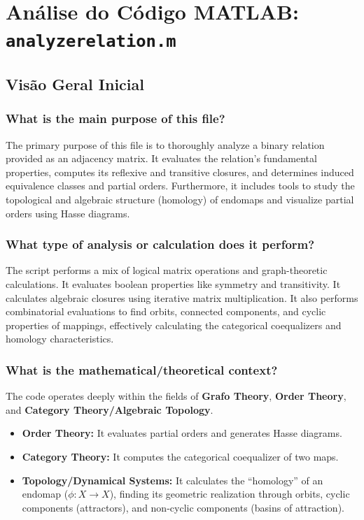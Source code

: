 \chapter{Análise do Código MATLAB: \texttt{analyzerelation.m}}
\section{Visão Geral Inicial}

\subsection*{What is the main purpose of this file?}
The primary purpose of this file is to thoroughly analyze a binary relation provided as an adjacency matrix. It evaluates the relation's fundamental properties, computes its reflexive and transitive closures, and determines induced equivalence classes and partial orders. Furthermore, it includes tools to study the topological and algebraic structure (homology) of endomaps and visualize partial orders using Hasse diagrams.

\subsection*{What type of analysis or calculation does it perform?}
The script performs a mix of logical matrix operations and graph-theoretic calculations. It evaluates boolean properties like symmetry and transitivity. It calculates algebraic closures using iterative matrix multiplication. It also performs combinatorial evaluations to find orbits, connected components, and cyclic properties of mappings, effectively calculating the categorical coequalizers and homology characteristics.

\subsection*{What is the mathematical/theoretical context?}
The code operates deeply within the fields of \textbf{Grafo Theory}, \textbf{Order Theory}, and \textbf{Category Theory/Algebraic Topology}. 
\begin{itemize}
    \item \textbf{Order Theory:} It evaluates partial orders and generates Hasse diagrams. 
    \item \textbf{Category Theory:} It computes the categorical coequalizer of two maps.
    \item \textbf{Topology/Dynamical Systems:} It calculates the ``homology'' of an endomap ($\phi: X \to X$), finding its geometric realization through orbits, cyclic components (attractors), and non-cyclic components (basins of attraction).
\end{itemize}

